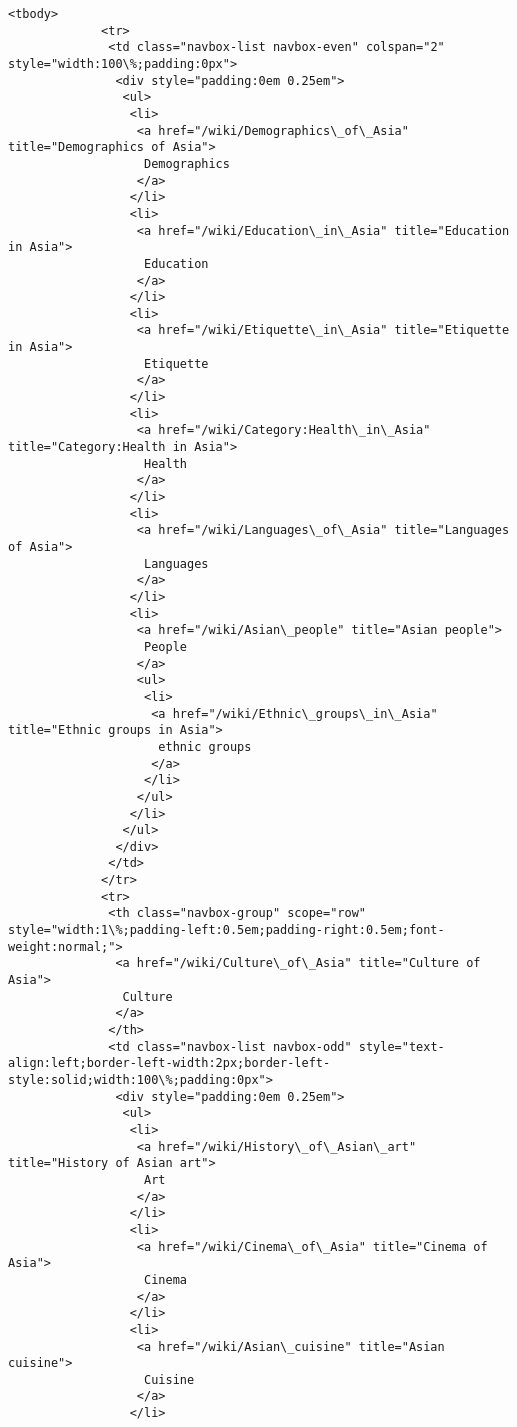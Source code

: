 \documentclass[11pt]{article}
\begin{document}
\begin{Verbatim}[commandchars=\\\{\}]
            <tbody>
             <tr>
              <td class="navbox-list navbox-even" colspan="2" style="width:100\%;padding:0px">
               <div style="padding:0em 0.25em">
                <ul>
                 <li>
                  <a href="/wiki/Demographics\_of\_Asia" title="Demographics of Asia">
                   Demographics
                  </a>
                 </li>
                 <li>
                  <a href="/wiki/Education\_in\_Asia" title="Education in Asia">
                   Education
                  </a>
                 </li>
                 <li>
                  <a href="/wiki/Etiquette\_in\_Asia" title="Etiquette in Asia">
                   Etiquette
                  </a>
                 </li>
                 <li>
                  <a href="/wiki/Category:Health\_in\_Asia" title="Category:Health in Asia">
                   Health
                  </a>
                 </li>
                 <li>
                  <a href="/wiki/Languages\_of\_Asia" title="Languages of Asia">
                   Languages
                  </a>
                 </li>
                 <li>
                  <a href="/wiki/Asian\_people" title="Asian people">
                   People
                  </a>
                  <ul>
                   <li>
                    <a href="/wiki/Ethnic\_groups\_in\_Asia" title="Ethnic groups in Asia">
                     ethnic groups
                    </a>
                   </li>
                  </ul>
                 </li>
                </ul>
               </div>
              </td>
             </tr>
             <tr>
              <th class="navbox-group" scope="row" style="width:1\%;padding-left:0.5em;padding-right:0.5em;font-weight:normal;">
               <a href="/wiki/Culture\_of\_Asia" title="Culture of Asia">
                Culture
               </a>
              </th>
              <td class="navbox-list navbox-odd" style="text-align:left;border-left-width:2px;border-left-style:solid;width:100\%;padding:0px">
               <div style="padding:0em 0.25em">
                <ul>
                 <li>
                  <a href="/wiki/History\_of\_Asian\_art" title="History of Asian art">
                   Art
                  </a>
                 </li>
                 <li>
                  <a href="/wiki/Cinema\_of\_Asia" title="Cinema of Asia">
                   Cinema
                  </a>
                 </li>
                 <li>
                  <a href="/wiki/Asian\_cuisine" title="Asian cuisine">
                   Cuisine
                  </a>
                 </li>

\end{Verbatim}
\end{document}
